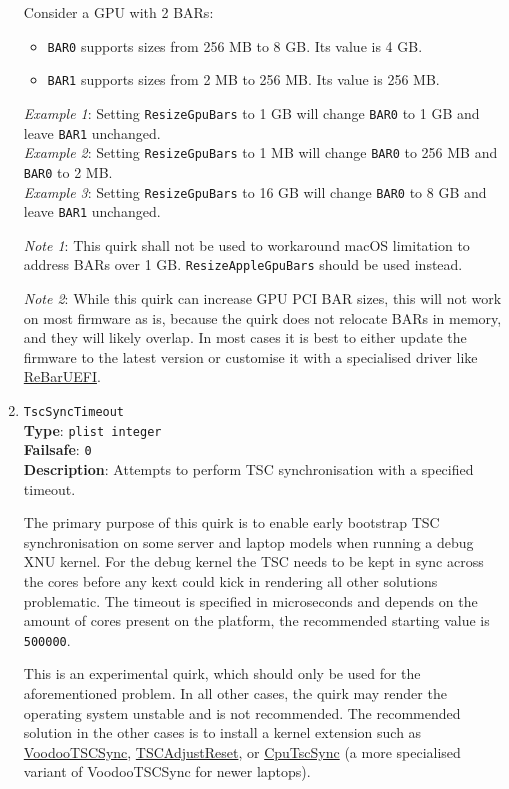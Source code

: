 \documentclass[]{article}
\providecommand{\tightlist}{%
  \setlength{\itemsep}{0pt}\setlength{\parskip}{0pt}}
\begin{document}
\begin{enumerate}
  Consider a GPU with 2 BARs:
  \begin{itemize}
    \tightlist
    \item \texttt{BAR0} supports sizes from 256 MB to 8 GB. Its value is 4 GB.
    \item \texttt{BAR1} supports sizes from 2 MB to 256 MB. Its value is 256 MB.
  \end{itemize}

  \emph{Example 1}: Setting \texttt{ResizeGpuBars} to 1 GB will change
  \texttt{BAR0} to 1 GB and leave \texttt{BAR1} unchanged.
  \\
  \emph{Example 2}: Setting \texttt{ResizeGpuBars} to 1 MB will change
  \texttt{BAR0} to 256 MB and \texttt{BAR0} to 2 MB.
  \\
  \emph{Example 3}: Setting \texttt{ResizeGpuBars} to 16 GB will change
  \texttt{BAR0} to 8 GB and leave \texttt{BAR1} unchanged.

  \emph{Note 1}: This quirk shall not be used to workaround macOS limitation
  to address BARs over 1 GB. \texttt{ResizeAppleGpuBars} should be used instead.

  \emph{Note 2}: While this quirk can increase GPU PCI BAR sizes, this will not
  work on most firmware as is, because the quirk does not relocate BARs in memory,
  and they will likely overlap. In most cases it is best to either update the
  firmware to the latest version or customise it with a specialised driver
  like \href{https://github.com/xCuri0/ReBarUEFI}{ReBarUEFI}.

\item
  \texttt{TscSyncTimeout}\\
  \textbf{Type}: \texttt{plist\ integer}\\
  \textbf{Failsafe}: \texttt{0}\\
  \textbf{Description}: Attempts to perform TSC synchronisation with a specified timeout.

  The primary purpose of this quirk is to enable early bootstrap TSC synchronisation
  on some server and laptop models when running a debug XNU kernel. For the debug kernel
  the TSC needs to be kept in sync across the cores before any kext could kick in rendering
  all other solutions problematic. The timeout is specified in microseconds and depends on the
  amount of cores present on the platform, the recommended starting value is \texttt{500000}.

  This is an experimental quirk, which should only be used for the aforementioned problem.
  In all other cases, the quirk may render the operating system unstable and is not recommended.
  The recommended solution in the other cases is to install a kernel extension such as
  \href{https://github.com/RehabMan/VoodooTSCSync}{VoodooTSCSync},
  \href{https://github.com/interferenc/TSCAdjustReset}{TSCAdjustReset},
  or \href{https://github.com/lvs1974/CpuTscSync}{CpuTscSync} (a more specialised
  variant of VoodooTSCSync for newer laptops).


\end{enumerate}
\end{document}
